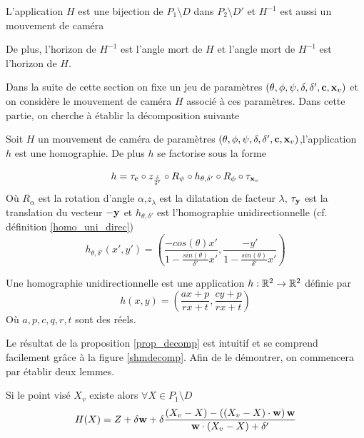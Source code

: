 \begin{remarque}
L'application $H$ est une bijection de $P_1 \setminus D$ dans $P_2 \setminus D'$ et $H^{-1}$ est aussi un mouvement de caméra

De plus, l'horizon de $H^{-1}$ est l'angle mort de $H$ et l'angle mort de $H^{-1}$ est l'horizon de $H$.
\end{remarque}

Dans la suite de cette section on fixe un jeu de paramètres $(\theta,\phi,\psi,\delta,\delta',\mathbf{c},\mathbf{x}_v)$ et on considère le mouvement de caméra $H$ associé à ces paramètres.
Dans cette partie, on cherche à établir la décomposition suivante
\begin{prop}
 Soit  $H$ un mouvement de caméra de paramètres $(\theta,\phi,\psi,\delta,\delta',\mathbf{c},\mathbf{x}_v)$,l'application $h$ est une homographie. De plus $h$ se factorise sous la forme
 
\begin{equation}
h = \tau_{\mathbf{c}} \circ z_{\frac{\delta}{\delta'}}  \circ R_{\psi} \circ h_{\theta,\delta'} \circ R_{\phi} \circ \tau_{\mathbf{x}_v}
\label{formul_decomp}
\end{equation}
Où $R_{\alpha}$ est la rotation d'angle $\alpha$,$z_\lambda$ est la dilatation de facteur $\lambda$, $\tau_{\mathbf{y}}$ est  la translation du vecteur $-\mathbf{y}$ et $h_{\theta,\delta'}$ est l'homographie unidirectionnelle (cf. définition \ref{homo_uni_direc})
\begin{equation}
h_{\theta,\delta'}(x',y')=\left(\frac{-cos(\theta)x'}{1-\frac{sin(\theta)}{\delta'}x'} ,\frac{-y'}{1-\frac{sin(\theta)}{\delta'}x'}\right)
\label{mise_perspective}
\end{equation}
\label{prop_decomp}
\end{prop}

\begin{Def}
Une homographie unidirectionnelle est une application $h:\mathbb{R}^{2} \rightarrow \mathbb{R}^{2}$ définie par 
\begin{equation*}
h(x,y)=\left ( \frac{ax+p}{rx+t} , \frac{cy+p}{rx+t} \right)
\end{equation*}
Où $a,p,c,q,r,t$ sont des réels.
\label{homo_uni_direc}
\end{Def}

Le résultat de la proposition \ref{prop_decomp} est intuitif et se comprend facilement grâce à la figure \ref{shmdecomp}. Afin de le démontrer, on commencera par établir deux lemmes.

\begin{lem}Si le point visé $X_v$ existe alors
$\forall X \in P_1 \setminus D$
\begin{equation}
H(X)=Z+\delta \mathbf{w}+\delta \frac{(X_v-X)-\left((X_v-X)\cdot \mathbf{w} \right) \mathbf{w}}{\mathbf{w} \cdot (X_v-X)+\delta'}
\label{homo_form_geo}
\end{equation}
\label{lem_homo_form_geo}
\end{lem}

